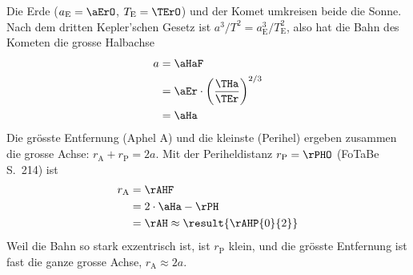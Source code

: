 \begin{center}
\end{center}

Die Erde ($a_\text{E} = \aErO$, $T_\text{E} = \TErO$) und der Komet umkreisen beide die Sonne. Nach dem dritten Kepler'schen Gesetz ist $a^3/T^2 = a_\text{E}^3/T_\text{E}^2$, also hat die Bahn des Kometen die grosse Halbachse
\begin{align}
 a &= \aHaF \\
   &= \aEr\cdot\left(\frac{\THa}{\TEr}\right)^{2/3} \\
   &= \aHa
\end{align}
Die grösste Entfernung (Aphel A) und die kleinste (Perihel) ergeben zusammen die grosse Achse: $r_\text{A} + r_\text{P} = 2a$. Mit der Periheldistanz $r_\text{P} = \rPHO$ (FoTaBe S.~214) ist
\begin{align}
 r_\text{A} &= \rAHF \\
   &= 2\cdot\aHa - \rPH \\
   &= \rAH \approx \result{\rAHP{0}{2}}
\end{align}
Weil die Bahn so stark exzentrisch ist, ist $r_\text{P}$ klein, und die grösste Entfernung ist fast die ganze grosse Achse, $r_\text{A} \approx 2a$.
